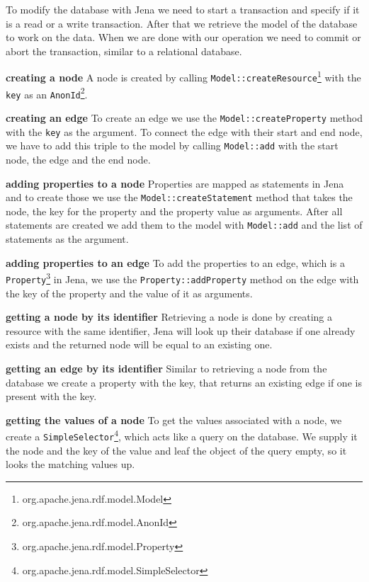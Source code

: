 To modify the database with Jena we need to start a transaction and specify if it is a read or a write transaction.
After that we retrieve the model of the database to work on the data.
When we are done with our operation we need to commit or abort the transaction,
similar to a relational database.

\textbf{creating a node} \newline
A node is created by calling \texttt{Model::createResource}\footnote{org.apache.jena.rdf.model.Model} with the \texttt{key} as an \texttt{AnonId}\footnote{org.apache.jena.rdf.model.AnonId}.

\textbf{creating an edge} \newline
To create an edge we use the \texttt{Model::createProperty} method with the \texttt{key} as the argument.
To connect the edge with their start and end node,
we have to add this triple to the model by calling \texttt{Model::add} with the start node,
the edge and the end node.

\textbf{adding properties to a node} \newline
Properties are mapped as statements in Jena and to create those we use the \linebreak
\texttt{Model::createStatement} method that takes the node, the key for the property and the property value as arguments.
After all statements are created we add them to the model with \texttt{Model::add} and the list of statements as the argument.

\textbf{adding properties to an edge} \newline
To add the properties to an edge,
which is a \texttt{Property}\footnote{org.apache.jena.rdf.model.Property} in Jena,
we use the \texttt{Property::addProperty} method on the edge with the key of the property and the value of it as arguments.

\textbf{getting a node by its identifier} \newline
Retrieving a node is done by creating a resource with the same identifier,
Jena will look up their database if one already exists and the returned node will be equal to an existing one.

\textbf{getting an edge by its identifier} \newline
Similar to retrieving a node from the database we create a property with the key,
that returns an existing edge if one is present with the key.

\textbf{getting the values of a node} \newline
To get the values associated with a node,
we create a \texttt{SimpleSelector}\footnote{org.apache.jena.rdf.model.SimpleSelector},
which acts like a query on the database.
We supply it the node and the key of the value and leaf the object of the query empty,
so it looks the matching values up.

